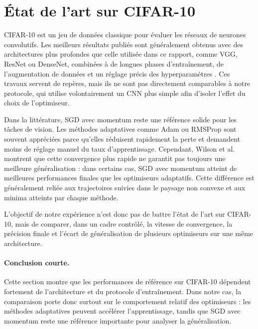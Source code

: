\documentclass[12pt]{article}
\begin{document}
\section{État de l'art sur CIFAR-10}
\label{sec:etatdelart}

CIFAR-10 est un jeu de données classique pour évaluer les réseaux de neurones
convolutifs. Les meilleurs résultats publiés sont généralement obtenus avec des
architectures plus profondes que celle utilisée dans ce rapport, comme VGG,
ResNet ou DenseNet, combinées à de longues phases d'entraînement, de
l'augmentation de données et un réglage précis des hyperparamètres
\cite{he2016resnet, simonyan2014vgg, huang2017densenet}. Ces travaux servent de
repères, mais ils ne sont pas directement comparables à notre protocole, qui
utilise volontairement un CNN plus simple afin d'isoler l'effet du choix de
l'optimiseur.

Dans la littérature, SGD avec momentum reste une référence solide pour les
tâches de vision. Les méthodes adaptatives comme Adam ou RMSProp sont souvent
appréciées parce qu'elles réduisent rapidement la perte et demandent moins de
réglage manuel du taux d'apprentissage. Cependant, Wilson et al.\
\cite{wilson2017marginal} montrent que cette convergence plus rapide ne garantit
pas toujours une meilleure généralisation : dans certains cas, SGD avec momentum
atteint de meilleures performances finales que les optimiseurs adaptatifs. Cette
différence est généralement reliée aux trajectoires suivies dans le paysage non
convexe et aux minima atteints par chaque méthode.

L'objectif de notre expérience n'est donc pas de battre l'état de l'art sur
CIFAR-10, mais de comparer, dans un cadre contrôlé, la vitesse de convergence,
la précision finale et l'écart de généralisation de plusieurs optimiseurs sur
une même architecture.

\paragraph{Conclusion courte.}
Cette section montre que les performances de référence sur CIFAR-10 dépendent
fortement de l'architecture et du protocole d'entraînement. Dans notre cas, la
comparaison porte donc surtout sur le comportement relatif des optimiseurs :
les méthodes adaptatives peuvent accélérer l'apprentissage, tandis que SGD avec
momentum reste une référence importante pour analyser la généralisation.
\end{document}

